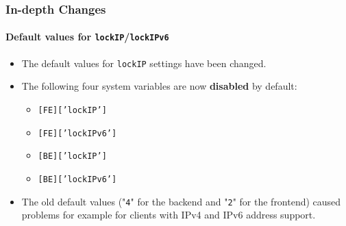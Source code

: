 
\begin{frame}[fragile]
	\frametitle{In-depth Changes}
	\framesubtitle{Default values for \texttt{lockIP}/\texttt{lockIPv6}}

	\lstset{basicstyle=\smaller\ttfamily}

	\begin{itemize}
		\item The default values for \texttt{lockIP} settings have been changed.
		\item The following four system variables are now \textbf{disabled} by default:

			\begin{itemize}
				\item \texttt{[FE]['lockIP']}
				\item \texttt{[FE]['lockIPv6']}
				\item \texttt{[BE]['lockIP']}
				\item \texttt{[BE]['lockIPv6']}
			\end{itemize}

		\item The old default values ("\texttt{4}" for the backend and "\texttt{2}" for the frontend)
			caused problems for example for clients with IPv4 and IPv6 address support.

	\end{itemize}

\end{frame}


